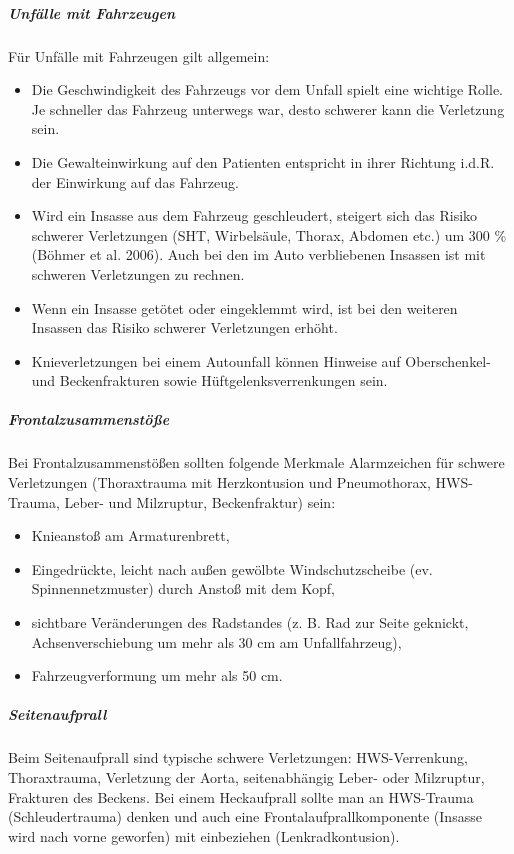 \subparagraph{Unfälle mit Fahrzeugen}

Für Unfälle mit Fahrzeugen gilt allgemein:

\begin{itemize}
    \item Die Geschwindigkeit des Fahrzeugs vor dem Unfall spielt eine wichtige Rolle. Je schneller das Fahrzeug unterwegs war, desto schwerer kann die Verletzung sein. 
    \item Die Gewalteinwirkung auf den Patienten entspricht in ihrer Richtung i.d.R. der Einwirkung auf das Fahrzeug.
    \item Wird ein Insasse aus dem Fahrzeug geschleudert, steigert sich das Risiko schwerer Verletzungen (SHT, Wirbelsäule, Thorax, Abdomen etc.) um 300 \% (Böhmer et al. 2006). Auch bei den im Auto verbliebenen Insassen ist mit schweren Verletzungen zu rechnen.
    \item Wenn ein Insasse getötet oder eingeklemmt wird, ist bei den weiteren Insassen das Risiko schwerer Verletzungen erhöht.
    \item Knieverletzungen bei einem Autounfall können Hinweise auf Oberschenkel- und Beckenfrakturen sowie Hüftgelenksverrenkungen sein.
\end{itemize}

\subparagraph{Frontalzusammenstöße}

Bei Frontalzusammenstößen sollten folgende Merkmale
Alarmzeichen für schwere Verletzungen (Thoraxtrauma mit Herzkontusion und Pneumothorax, HWS-Trauma, Leber- und Milzruptur, Beckenfraktur) sein:
\begin{itemize}
    \item Knieanstoß am Armaturenbrett,
    \item Eingedrückte, leicht nach außen gewölbte Windschutzscheibe (ev. Spinnennetzmuster) durch Anstoß mit dem Kopf,
    \item sichtbare Veränderungen des Radstandes (z. B. Rad zur Seite geknickt, Achsenverschiebung um mehr als 30 cm am Unfallfahrzeug),
    \item Fahrzeugverformung um mehr als 50 cm.
\end{itemize}

\subparagraph{Seitenaufprall}

Beim Seitenaufprall sind typische schwere Verletzungen: HWS-Verrenkung, Thoraxtrauma, Verletzung der Aorta, seitenabhängig Leber- oder Milzruptur, Frakturen des Beckens. Bei einem Heckaufprall sollte man an HWS-Trauma (Schleudertrauma) denken und auch eine Frontalaufprallkomponente (Insasse wird nach vorne geworfen) mit einbeziehen (Lenkradkontusion).

